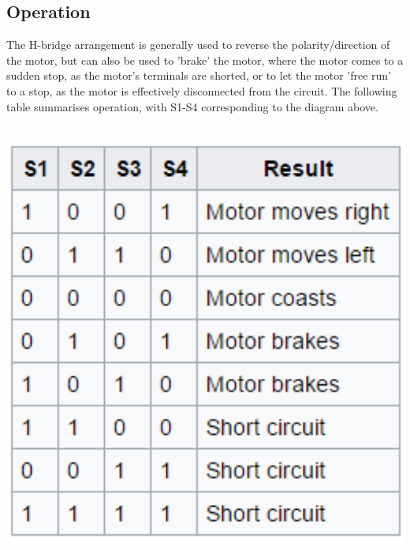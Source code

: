 \subsection{Operation}
The H-bridge arrangement is generally used to reverse the polarity/direction of the motor, but can also be used to 'brake' the motor, where the motor comes to a sudden stop, as the motor's terminals are shorted, or to let the motor 'free run' to a stop, as the motor is effectively disconnected from the circuit. The following table summarises operation, with S1-S4 corresponding to the diagram above.
\\\\
\centerline{
	\centering
	\includegraphics[width=1.0\textwidth]{overview/images/operations.png}
}